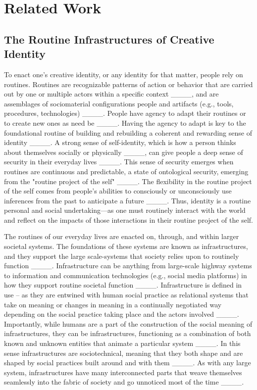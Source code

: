 \section{Related Work}
\subsection{The Routine Infrastructures of Creative Identity}

    To enact one's creative identity, or any identity for that matter, people rely on routines. Routines are recognizable patterns of action or behavior that are carried out by one or multiple actors within a specific context ____, and are assemblages of sociomaterial configurations people and artifacts (e.g., tools, procedures, technologies) ____. People have agency to adapt their routines or to create new ones as need be ____. Having the agency to adapt is key to the foundational routine of building and rebuilding a coherent and rewarding sense of identity ____. A strong sense of self-identity, which is how a person thinks about themselves socially or physically ____, can give people a deep sense of security in their everyday lives ____. This sense of security emerges when routines are continuous and predictable, a state of ontological security, emerging from the "routine project of the self" ____. The flexibility in the routine project of the self comes from people's abilities to consciously or unconsciously use inferences from the past to anticipate a future ____. Thus, identity is a routine personal and social undertaking—as one must routinely interact with the world and reflect on the impacts of those interactions in their routine project of the self. 
    
    The routines of our everyday lives are enacted on, through, and within larger societal systems. The foundations of these systems are known as infrastructures, and they support the large scale-systems that society relies upon to routinely function ____. Infrastructure can be anything from large-scale highway systems to information and communication technologies (e.g., social media platforms) in how they support routine societal function ____. Infrastructure is defined in use – as they are entwined with human social practice as relational systems that take on meaning or changes in meaning in a continually negotiated way depending on the social practice taking place and the actors involved ____. Importantly, while humans are a part of the construction of the social meaning of infrastructures, they can be infrastructures, functioning as a combination of both known and unknown entities that animate a particular system ____. In this sense infrastructures are sociotechnical, meaning that they both shape and are shaped by social practices built around and with them ____. As with any large system, infrastructures have many interconnected parts that weave themselves seamlessly into the fabric of society and go unnoticed most of the time ____. \par

